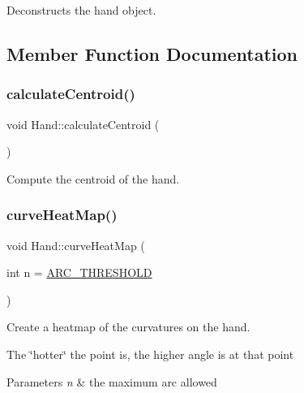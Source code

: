 Deconstructs the hand object. 



\subsection{Member Function Documentation}
\hypertarget{class_hand_aaa3e2992447d5cb16b0c9095028b07c0}{}\label{class_hand_aaa3e2992447d5cb16b0c9095028b07c0} 
\subsubsection{\texorpdfstring{calculate\+Centroid()}{calculateCentroid()}}
{\footnotesize\ttfamily void Hand\+::calculate\+Centroid (\begin{DoxyParamCaption}{ }\end{DoxyParamCaption})\hspace{0.3cm}{\ttfamily [protected]}}



Compute the centroid of the hand. 

\hypertarget{class_hand_ae3d90ae264631ad6af2efbb5baddfda6}{}\label{class_hand_ae3d90ae264631ad6af2efbb5baddfda6} 
\subsubsection{\texorpdfstring{curve\+Heat\+Map()}{curveHeatMap()}}
{\footnotesize\ttfamily void Hand\+::curve\+Heat\+Map (\begin{DoxyParamCaption}\item[{int}]{n = {\ttfamily \hyperlink{_hand_8h_ae12b8d82e4eb35d8bd8cca49ba677eac}{A\+R\+C\+\_\+\+T\+H\+R\+E\+S\+H\+O\+LD}} }\end{DoxyParamCaption})\hspace{0.3cm}{\ttfamily [protected]}}



Create a heatmap of the curvatures on the hand. 

The \char`\"{}hotter\char`\"{} the point is, the higher angle is at that point 
\begin{DoxyParams}{Parameters}
{\em n} & the maximum arc allowed \\
\hline
\end{DoxyParams}
\hypertarget{class_hand_ac55aeccf6d1c8e2aa8105d334cdf1339}{}\label{class_hand_ac55aeccf6d1c8e2aa8105d334cdf1339} 

